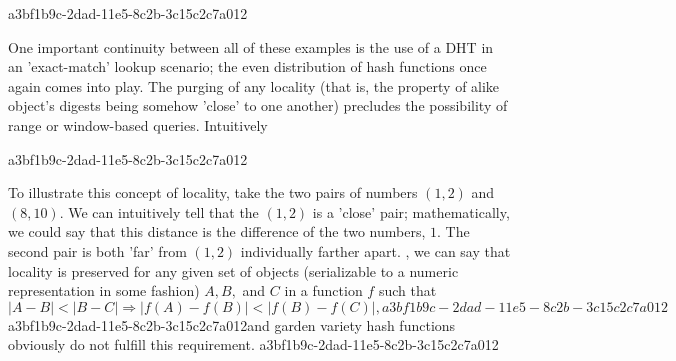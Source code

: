\documentclass[12pt]{article}
\begin{document}
a3bf1b9c-2dad-11e5-8c2b-3c15c2c7a012\par One important continuity between all of these examples is the use of a DHT in an 'exact-match' lookup scenario; the even distribution of hash functions once again comes into play. The purging of any locality (that is, the property of alike object's digests being somehow 'close' to one another) precludes the possibility of range or window-based queries. Intuitively

a3bf1b9c-2dad-11e5-8c2b-3c15c2c7a012\par To illustrate this concept of locality, take the two pairs of numbers $(1,2)$ and $(8,10)$. We can intuitively tell that the $(1,2)$ is a 'close' pair; mathematically, we could say that this distance is the difference of the two numbers, $1$. The second pair is both 'far' from $(1,2)$ individually farther apart. , we can say that locality is preserved for any given set of objects (serializable to a numeric representation in some fashion) $A,B,$ and $C$ in a function $f$ such that
\begin{equation}
|A-B| < |B-C| \Rightarrow |f(A)-f(B)| < |f(B) - f(C)|,
a3bf1b9c-2dad-11e5-8c2b-3c15c2c7a012\end{equation}
a3bf1b9c-2dad-11e5-8c2b-3c15c2c7a012and garden variety hash functions obviously do not fulfill this requirement.
a3bf1b9c-2dad-11e5-8c2b-3c15c2c7a012
\printbibliography
\end{document}

